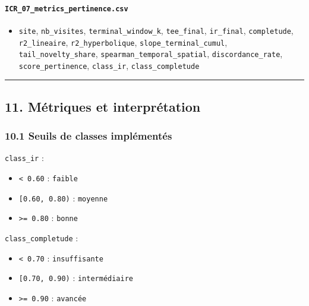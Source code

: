 \paragraph{\texorpdfstring{\texttt{ICR\_07\_metrics\_pertinence.csv}}{ICR\_07\_metrics\_pertinence.csv}}\label{icr_07_metrics_pertinence.csv}

\begin{itemize}
\tightlist
\item
  \texttt{site}, \texttt{nb\_visites}, \texttt{terminal\_window\_k},
  \texttt{tee\_final}, \texttt{ir\_final}, \texttt{completude},
  \texttt{r2\_lineaire}, \texttt{r2\_hyperbolique},
  \texttt{slope\_terminal\_cumul}, \texttt{tail\_novelty\_share},
  \texttt{spearman\_temporal\_spatial}, \texttt{discordance\_rate},
  \texttt{score\_pertinence}, \texttt{class\_ir},
  \texttt{class\_completude}
\end{itemize}

\begin{center}\rule{0.5\linewidth}{0.5pt}\end{center}

\subsection{11. Métriques et
interprétation}\label{muxe9triques-et-interpruxe9tation}

\subsubsection{10.1 Seuils de classes
implémentés}\label{seuils-de-classes-impluxe9mentuxe9s}

\texttt{class\_ir} :

\begin{itemize}
\tightlist
\item
  \texttt{\textless{}\ 0.60} : \texttt{faible}
\item
  \texttt{{[}0.60,\ 0.80)} : \texttt{moyenne}
\item
  \texttt{\textgreater{}=\ 0.80} : \texttt{bonne}
\end{itemize}

\texttt{class\_completude} :

\begin{itemize}
\tightlist
\item
  \texttt{\textless{}\ 0.70} : \texttt{insuffisante}
\item
  \texttt{{[}0.70,\ 0.90)} : \texttt{intermédiaire}
\item
  \texttt{\textgreater{}=\ 0.90} : \texttt{avancée}
\end{itemize}

